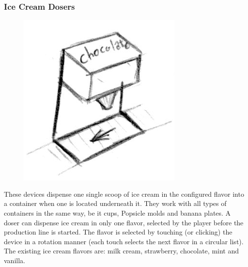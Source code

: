\documentclass[a4paper]{scrartcl}
\begin{document}
        \subsubsection{Ice Cream Dosers}
            \begin{minipage}[t][8em][t]{\textwidth}
                \begin{figure}
                    \vspace{-20pt}
                    \includegraphics[scale=1]{devices/ice_cream_doser}
                    \vspace{-20pt}
                \end{figure}

                These devices dispense one single scoop of ice cream in the
                configured flavor into a container when one is located
                underneath it. They work with all types of containers in the
                same way, be it cups, Popsicle molds and banana plates. A doser
                can dispense ice cream in only one flavor, selected by the
                player before the production line is started. The flavor is
                selected by touching (or clicking) the device in a rotation
                manner (each touch selects the next flavor in a circular list).
                \\
                The existing ice cream flavors are: milk cream, strawberry,
                chocolate, mint and vanilla.
            \end{minipage}
\end{document}
